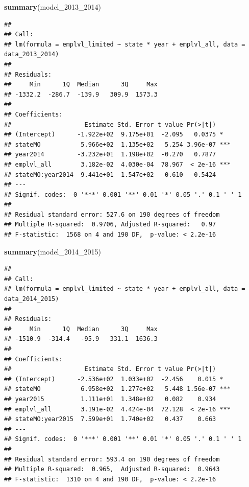 \documentclass[
]{article}
\newenvironment{Shaded}{\begin{snugshade}}{\end{snugshade}}
\newcommand{\FunctionTok}[1]{\textcolor[rgb]{0.13,0.29,0.53}{\textbf{#1}}}
\newcommand{\NormalTok}[1]{#1}
\begin{document}
\begin{Shaded}
\begin{Highlighting}[]
\FunctionTok{summary}\NormalTok{(model\_2013\_2014)}
\end{Highlighting}
\end{Shaded}

\begin{verbatim}
## 
## Call:
## lm(formula = emplvl_limited ~ state * year + emplvl_all, data = data_2013_2014)
## 
## Residuals:
##     Min      1Q  Median      3Q     Max 
## -1332.2  -286.7  -139.9   309.9  1573.3 
## 
## Coefficients:
##                    Estimate Std. Error t value Pr(>|t|)    
## (Intercept)      -1.922e+02  9.175e+01  -2.095   0.0375 *  
## stateMO           5.966e+02  1.135e+02   5.254 3.96e-07 ***
## year2014         -3.232e+01  1.198e+02  -0.270   0.7877    
## emplvl_all        3.182e-02  4.030e-04  78.967  < 2e-16 ***
## stateMO:year2014  9.441e+01  1.547e+02   0.610   0.5424    
## ---
## Signif. codes:  0 '***' 0.001 '**' 0.01 '*' 0.05 '.' 0.1 ' ' 1
## 
## Residual standard error: 527.6 on 190 degrees of freedom
## Multiple R-squared:  0.9706, Adjusted R-squared:   0.97 
## F-statistic:  1568 on 4 and 190 DF,  p-value: < 2.2e-16
\end{verbatim}

\begin{Shaded}
\begin{Highlighting}[]
\FunctionTok{summary}\NormalTok{(model\_2014\_2015)}
\end{Highlighting}
\end{Shaded}

\begin{verbatim}
## 
## Call:
## lm(formula = emplvl_limited ~ state * year + emplvl_all, data = data_2014_2015)
## 
## Residuals:
##     Min      1Q  Median      3Q     Max 
## -1510.9  -314.4   -95.9   331.1  1636.3 
## 
## Coefficients:
##                    Estimate Std. Error t value Pr(>|t|)    
## (Intercept)      -2.536e+02  1.033e+02  -2.456    0.015 *  
## stateMO           6.958e+02  1.277e+02   5.448 1.56e-07 ***
## year2015          1.111e+01  1.348e+02   0.082    0.934    
## emplvl_all        3.191e-02  4.424e-04  72.128  < 2e-16 ***
## stateMO:year2015  7.599e+01  1.740e+02   0.437    0.663    
## ---
## Signif. codes:  0 '***' 0.001 '**' 0.01 '*' 0.05 '.' 0.1 ' ' 1
## 
## Residual standard error: 593.4 on 190 degrees of freedom
## Multiple R-squared:  0.965,  Adjusted R-squared:  0.9643 
## F-statistic:  1310 on 4 and 190 DF,  p-value: < 2.2e-16
\end{verbatim}
\end{document}
